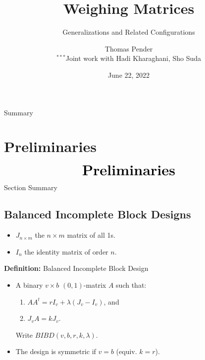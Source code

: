 \documentclass{beamer}
\title[Weighing Matrices]{Weighing Matrices}
\subtitle{Generalizations and Related Configurations}
\author[T. Pender]{Thomas Pender\\\scriptsize $^{***}$Joint work with Hadi Kharaghani, Sho Suda}
\institute[U of L]{Department of Mathematics and Computer Science\\University of
Lethbridge}
\date[06/22/2022]{June 22, 2022}
\begin{document}
{
\begin{frame}
  \titlepage
\end{frame}
}

\begin{frame}{Summary}
  \tableofcontents[hideallsubsections,sections={1-5}]
\end{frame}


\section{Preliminaries}

\begin{frame}
  \[
    \text{\huge\bf Preliminaries}
  \]
\end{frame}

\begin{frame}{Section Summary}
  \tableofcontents[sections={1}]
\end{frame}


\subsection{Balanced Incomplete Block Designs}

\begin{frame}

  \begin{itemize}
  \item $J_{n \times m}$ the $n \times m$ matrix of all 1s.
  \item $I_n$ the identity matrix of order $n$.

  \end{itemize}

  \begin{block}{{\bf Definition:} Balanced Incomplete Block Design}
    \begin{itemize}
    \item A binary $v \times b$ $(0,1)$-matrix $A$ such that:
      \begin{enumerate}
      \item $AA^t = rI_v + \lambda(J_v-I_v)$, and
      \item $J_vA = kJ_v$.
      \end{enumerate}
      Write $BIBD(v,b,r,k,\lambda)$.
    \item The design is symmetric if $v=b$ (equiv. $k=r$).
    \end{itemize}
  \end{block}

\end{frame}
\end{document}
